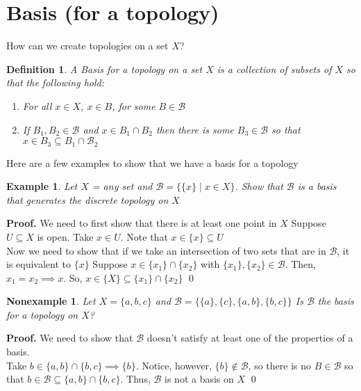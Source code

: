\documentclass{article}
\newtheorem*{definition*}{Definition}
\newtheorem*{example*}{Example}
\newtheorem*{nonex*}{Nonexample}
\newcommand{\B}{\mathcal{B}}
\begin{document}
\newpage

\section*{Basis (for a topology)}
How can we create topologies on a set $X$?

\begin{tcolorbox}[colback=definition!65]
   \begin{definition*}
      A Basis for a topology on a set $X$ is a collection of subsets of $X$ so that the following hold:
      \begin{enumerate}
        \item[(i)] For all $x \in X$, $x \in B$, for some $B \in \B$
        \item[(ii)] If $B_1, B_2 \in \B$ and $x \in B_1 \cap B_2$ then there is some $B_3 \in \B$ so that $x \in B_3 \subseteq B_1 \cap \B_2$
      \end{enumerate}
   \end{definition*} 
\end{tcolorbox}

\vspace{2mm}
Here are a few examples to show that we have a basis for a topology

\begin{tcolorbox}[colback=example!65]
    \begin{example*}
       Let $X$ = any set and $\B = \{\{x\} \mid x \in X\}$. Show that $\B$ is a basis that generates the discrete topology on $X$ 
    \end{example*}
    \textbf{Proof.} We need to first show that there is at least one point in $X$
    Suppose $U \subseteq X$ is open. Take $x \in U$. Note that $x \in \{x\} \subseteq U$ \\

    Now we need to show that if we take an intersection of two sets that are in $\B$, it is equivalent to $\{x\}$
    Suppose $x \in \{x_1\} \cap \{x_2\}$ with $\{x_1\}, \{x_2\} \in \B$. Then, $x_1 = x_2 \implies x$. So, $x \in \{X\} \subseteq \{x_1\} \cap \{x_2\}$ \qed
\end{tcolorbox}

\begin{tcolorbox}[colback=nonex!67]
\begin{nonex*}
   Let $X = \{a,b,c\}$ and $\B =\{\{a\},\{c\},\{a,b\},\{b,c\}\}$ Is $\B$ the basis for a topology on $X$?
\end{nonex*}

\textbf{Proof.} We need to show that $\B$ doesn't satisfy at least one of the properties of a basis. \\

Take $b \in \{a,b\} \cap \{b,c\} \implies \{b\}$. Notice, however, $\{b\} \notin \B$, so there is no $B \in \B$ so that $b \in \B \subseteq \{a,b\} \cap \{b,c\}$. Thus, $\B$ is not a basis on $X$ \qed
 
\end{tcolorbox}
\end{document}
